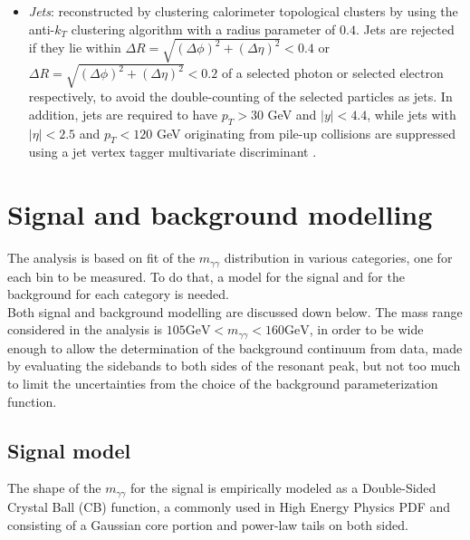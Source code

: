 \begin{itemize}
\item \emph{Jets}: reconstructed by clustering calorimeter topological clusters by using the anti-$k_T$ clustering algorithm with a radius parameter of $0.4$. Jets are rejected if they lie within $\Delta R = \sqrt{(\Delta\phi)^2 +(\Delta\eta)^2} < 0.4$ or $\Delta R = \sqrt{(\Delta\phi)^2 +(\Delta\eta)^2} < 0.2$ of a selected photon or selected electron respectively, to avoid the double-counting of the selected particles as jets. In addition, jets are required to have $p_T > 30$ GeV and $|y| < 4.4$, while jets with $|\eta| < 2.5$ and $p_T < 120$ GeV originating from pile-up collisions are suppressed using a jet vertex tagger multivariate discriminant \cite{ATLAS-CONF-2014-018, Aad_2016_pileup}.
\end{itemize}
\section{Signal and background modelling}
The analysis is based on fit of the $m_{\gamma\gamma}$ distribution in various categories, one for each bin to be measured. To do that, a model for the signal and for the background for each category is needed.
\\
Both signal and background modelling are discussed down below. The mass range considered in the analysis is $105 \text{GeV} < m_{\gamma\gamma} < 160 \text{GeV}$, in order to be wide enough to allow the determination of the background continuum from data, made by evaluating the sidebands to both sides of the resonant peak, but not too much to limit the uncertainties from the choice of the background parameterization function.

\subsection{Signal model}
The shape of the $m_{\gamma\gamma}$ for the signal is empirically modeled as a Double-Sided Crystal Ball (CB) function, a  commonly used in High Energy Physics PDF and consisting of a Gaussian core portion and power-law tails on both sided.

